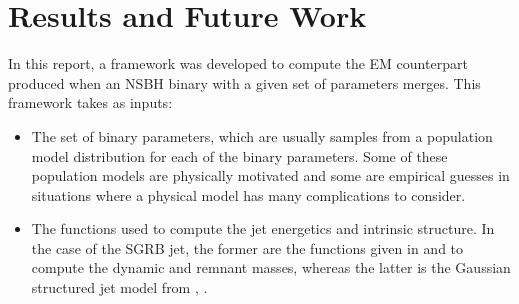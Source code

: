 \chapter{Results and Future Work}\label{ch:results-future}

    In this report, a framework was developed to compute the EM counterpart produced
    when an NSBH binary with a given set of parameters merges. This framework takes as
    inputs:

    \begin{itemize}

        \item The set of binary parameters, which are usually samples from a population
            model distribution for each of the binary parameters. Some of these
            population models are physically motivated and some are empirical guesses
            in situations where a physical model has many complications to consider.

        \item The functions used to compute the jet energetics and intrinsic structure.
            In the case of the SGRB jet, the former are the functions given in
            \cite{kawaguchi_2016} and \cite{foucart_2018} to compute the dynamic and
            remnant masses, whereas the latter is the Gaussian structured jet model from
            \cite{salafia_2015}, \cite{saleem_2020B}.

    \end{itemize}


